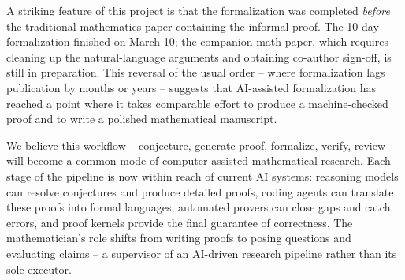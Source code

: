 \documentclass[11pt]{article}
\begin{document}
A striking feature of this project is that the formalization was completed \emph{before} the traditional mathematics paper containing the informal proof. The 10-day formalization finished on March 10; the companion math paper, which requires cleaning up the natural-language arguments and obtaining co-author sign-off, is still in preparation. This reversal of the usual order -- where formalization lags publication by months or years -- suggests that AI-assisted formalization has reached a point where it takes comparable effort to produce a machine-checked proof and to write a polished mathematical manuscript.

We believe this workflow -- conjecture, generate proof, formalize, verify, review -- will become a common mode of computer-assisted mathematical research. Each stage of the pipeline is now within reach of current AI systems: reasoning models can resolve conjectures and produce detailed proofs, coding agents can translate these proofs into formal languages, automated provers can close gaps and catch errors, and proof kernels provide the final guarantee of correctness. The mathematician's role shifts from writing proofs to posing questions and evaluating claims -- a supervisor of an AI-driven research pipeline rather than its sole executor.


\end{document}
